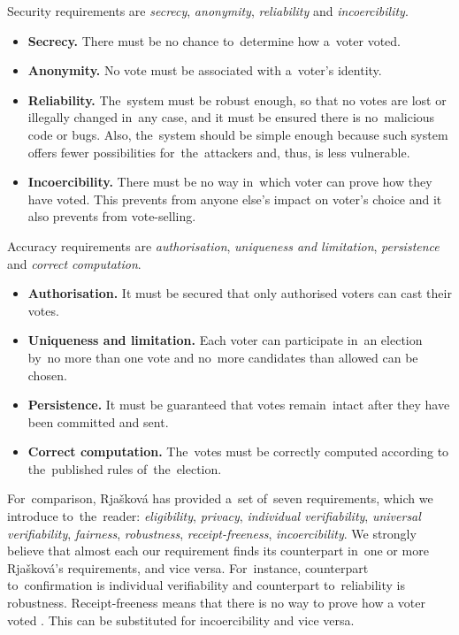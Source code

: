 Security requirements are \emph{secrecy}, \emph{anonymity}, \emph{reliability} and \emph{incoercibility}.
\begin{itemize}
\item \textbf{Secrecy.} There must be no chance to~determine how a~voter voted.
\item \textbf{Anonymity.} No vote must be associated with a~voter's identity.
\item \textbf{Reliability.} The~system must be robust enough, so that no votes are lost or illegally changed in~any case, and it must be ensured there is no~malicious code or bugs. Also, the~system should be simple enough because such system offers fewer possibilities for~the~attackers and, thus, is less vulnerable.
\item \textbf{Incoercibility.} There must be no way in~which voter can prove how they have voted. This prevents from anyone else's impact on voter's choice and it also prevents from vote-selling.
\end{itemize}

Accuracy requirements are \emph{authorisation}, \emph{uniqueness and limitation}, \emph{persistence} and \emph{correct computation}.

\begin{itemize}
\item \textbf{Authorisation.} It must be secured that only authorised voters can cast their votes.
\item \textbf{Uniqueness and limitation.}  Each voter can participate in~an election by~no more than one vote and no~more candidates than allowed can be chosen.
\item \textbf{Persistence.} It must be guaranteed that votes remain~intact after they have been committed and sent.
\item \textbf{Correct computation.} The~votes must be correctly computed according to the~published rules of~the~election.
\end{itemize}
For~comparison, Rjašková \cite{Rjaskova} has provided a~set of~seven requirements, which we introduce to~the~reader: \emph{eligibility}, \emph{privacy}, \emph{individual verifiability}, \emph{universal verifiability}, \emph{fairness}, \emph{robustness}, \emph{receipt-freeness}, \emph{incoercibility}. We strongly believe that almost each our requirement finds its counterpart in~one or more Rjašková's requirements, and vice versa. For~instance, counterpart to~confirmation is individual verifiability and counterpart to~reliability is robustness. Receipt-freeness means that there is no way to prove how a voter voted \cite{Delaune}. This can be substituted for incoercibility and vice versa.

